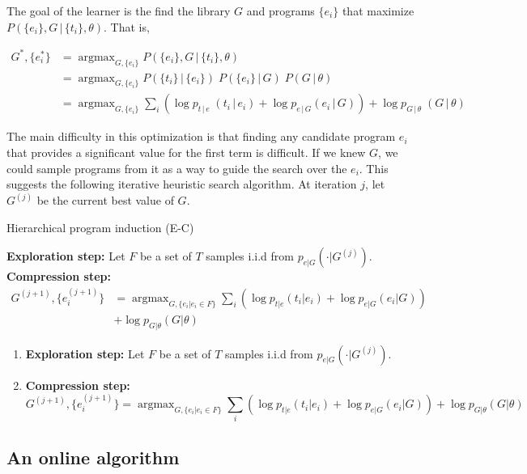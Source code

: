 \documentclass{article}
\renewcommand{\given}{\, | \,}
\DeclareMathOperator*{\argmax}{argmax}
\begin{document}
The goal of the learner is the find the library $G$ and programs
$\{e_i\}$ that maximize $P(\{e_i\}, G \given  \{t_i\}, \theta)$. That is, 

\begin{align}
G^*, \{e^*_i\} &= \argmax_{G, \{e_i\} }
   P(\{e_i\}, G \given  \{t_i\}, \theta)\\
&= \argmax_{G, \{e_i\} }  P(\{t_i\} \given \{e_i\}) \;
  P(\{e_i\} \given G) \; P(G \given \theta)\\
&= \argmax_{G, \{e_i\} }
  \sum_i \left( 
  \log{p_{t\given e}\;(t_i \given e_i)}+ 
  \log{p_{e \given G}(e_i \given G)}
  \right ) +
  \log{p_{G \given \theta}\; (G \given \theta)}
\label{eq:objective}
\end{align}

The main difficulty in this optimization is that finding any candidate
program $e_i$ that provides a significant value for the first term is
difficult. If we knew $G$, we could sample programs from it as a way to
guide the search over the $e_i$. This suggests the following iterative
heuristic search algorithm. At iteration $j$, let $G^{(j)}$ be the
current best value of $G$. 

\begin{algorithm}
\caption{Hierarchical program induction (E-C)}\label{alg:basic-progind}
\begin{algorithmic}[1]
\State  \textbf{Exploration step: } Let $F$ be a set of $T$ samples
  i.i.d from $p_{e|G}(\cdot | G^{(j)})$.
\State \textbf{Compression step: } 
\begin{align*}
G^{(j+1)}, \{e^{(j+1)}_i\} &= 
\argmax_{G, \{e_i | e_i \in F \}}
\sum_i \left( 
\log{p_{t|e}(t_i|e_i)}+ 
\log{p_{e|G}(e_i|G)} \right )\\
&+
\log{p_{G|\theta}(G|\theta)}
\end{align*}
\end{algorithmic}
\end{algorithm}

\begin{enumerate}
\item \textbf{Exploration step: } Let $F$ be a set of $T$ samples
  i.i.d from $p_{e|G}(\cdot | G^{(j)})$.
\item \textbf{Compression step: } 
$$G^{(j+1)}, \{e^{(j+1)}_i\} = 
\argmax_{G, \{e_i | e_i \in F \}}
\sum_i \left( 
\log{p_{t|e}(t_i|e_i)}+ 
\log{p_{e|G}(e_i|G)}
\right ) +
\log{p_{G|\theta}(G|\theta)}
$$
\end{enumerate}

\subsection{An online algorithm}
\end{document}
